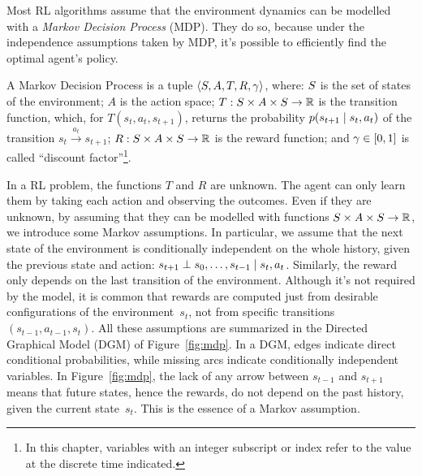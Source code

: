Most RL algorithms assume that the environment dynamics can be modelled with a
\emph{Markov Decision Process} (MDP). They do so, because under the independence assumptions taken by MDP,
it's possible to efficiently find the optimal agent's policy.

\begin{definition}
	A Markov Decision Process is a tuple $\langle S, A, T, R, \gamma
	\rangle$, where: $S$ is the set of states of the environment; $A$ is
	the action space; $T: S \times A \times S \to \mathbb{R}$ is the
	transition function, which, for ${T(s_{t}, a_{t}, s_{t+1})}$, returns the
	probability $p(s_{t+1} \mid s_{t}, a_{t})$ of the transition ${s_{t}
	\xrightarrow{a_{t}} s_{t+1}}$; $R: S \times A \times S \to \mathbb{R}$
	is the reward function; and $\gamma \in [0, 1]$ is called ``discount
	factor''\footnote{In this chapter, variables with an integer subscript or
	index refer to the value at the discrete time indicated.}.
\end{definition}

In a RL problem, the functions $T$ and $R$ are unknown. The agent can only
learn them by taking each action and observing the outcomes. Even if they are
unknown, by assuming that they can be modelled with functions ${S \times
A \times S \to \mathbb{R}}$, we introduce some Markov assumptions. In
particular, we assume that the next state of the environment is conditionally
independent on the whole history, given the previous state and action:
$s_{t+1} \perp s_{0}, \dots, s_{t-1} \mid s_{t}, a_{t}$. Similarly, the
reward only depends on the last transition of the environment.  Although it's
not required by the model, it is common that rewards are computed just from
desirable configurations of the environment~$s_{t}$, not from specific
transitions $(s_{t-1}, a_{t-1}, s_{t})$. All these assumptions are summarized
in the Directed Graphical Model (DGM) of Figure~\ref{fig:mdp}. In a DGM, edges indicate direct conditional
probabilities, while missing arcs indicate conditionally independent
variables.  In Figure~\ref{fig:mdp}, the lack of any arrow between $s_{t-1}$
and $s_{t+1}$ means that future states, hence the rewards, do not depend on
the past history, given the current state~$s_t$.  This is the essence of a
Markov assumption.

